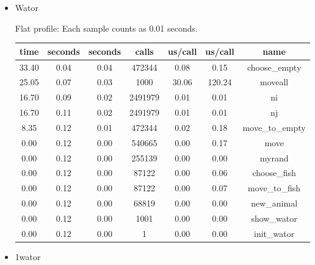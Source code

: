 \documentclass[a4paper,10pt]{article}
\begin{document}
\begin{itemize}
 
\item Wator

Flat profile:
Each sample counts as 0.01 seconds.
\begin{center}
  \begin{tabular}{| c | c | c | c | c | c | c |}
    \hline
time &   seconds &   seconds &    calls &  us/call &   us/call &   name \\ \hline    
 33.40 &      0.04 &     0.04 &   472344 &     0.08 &      0.15 &   choose\_empty \\ \hline
 25.05 &     0.07   &  0.03  &   1000  &  30.06  & 120.24 & moveall \\ \hline
 16.70 &      0.09 &     0.02 &  2491979 &     0.01 &      0.01 &   ni \\ \hline
 16.70 &      0.11 &     0.02 &  2491979 &     0.01 &      0.01 &   nj \\ \hline
  8.35 &      0.12 &     0.01 &   472344 &     0.02 &      0.18 &   move\_to\_empty \\ \hline
  0.00 &      0.12 &     0.00 &   540665 &     0.00 &      0.17 &   move \\ \hline
  0.00 &      0.12 &     0.00 &   255139 &     0.00 &      0.00 &   myrand \\ \hline
  0.00 &      0.12 &     0.00 &    87122 &     0.00 &      0.06 &   choose\_fish \\ \hline
  0.00 &      0.12 &     0.00 &    87122 &     0.00 &      0.07 &   move\_to\_fish \\ \hline
  0.00 &      0.12 &     0.00 &    68819 &     0.00 &      0.00 &   new\_animal \\ \hline
  0.00 &      0.12 &     0.00 &     1001 &     0.00 &      0.00 &   show\_wator \\ \hline
  0.00 &      0.12 &     0.00 &        1 &     0.00 &      0.00 &   init\_wator \\ \hline

  \end{tabular}
\end{center}

\item 1wator


\end{itemize}
\end{document}
